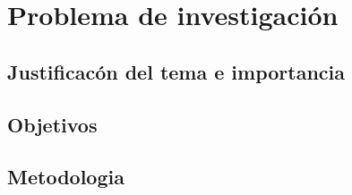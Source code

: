 \chapter{Problema de investigaci\'on}
	\section{Justificac\'on del tema e importancia}
	\section{Objetivos}
	\section{Metodologia}
